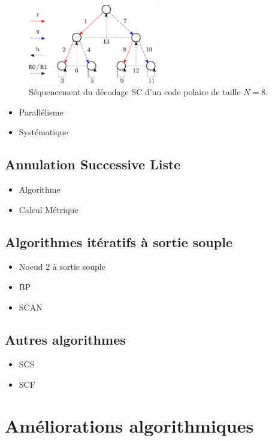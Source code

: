 \begin{figure}[b]
\centering
\includegraphics[width=0.5\textwidth]{main/ch1_fig/seq_sc}
\caption{Séquencement du décodage SC d'un code polaire de taille $N=8$.}
\label{fig:seq_sc}
\end{figure}

\begin{itemize}
\item Parallélisme
\item Systématique
\end{itemize}
\subsection{Annulation Successive Liste}
\begin{itemize}
\item Algorithme
\item Calcul Métrique

\end{itemize}
\subsection{Algorithmes itératifs à sortie souple}
\begin{itemize}
\item Noeud 2 à sortie souple
\item BP
\item SCAN
\end{itemize}

\subsection{Autres algorithmes}
\begin{itemize}
	\item SCS
	\item SCF
\end{itemize}
\section{Améliorations algorithmiques}

